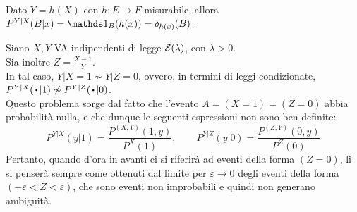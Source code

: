 \begin{ese}
Dato $Y = h(X)$ con $h: E \to F$ misurabile, allora $P^{Y|X}(B|x) = \Ind_B(h(x)) = \delta_{h(x)}(B)$.
\end{ese}
\medskip

\begin{ese}
Siano $X, Y$ VA indipendenti di legge $\mathcal E(\lambda)$, con $\lambda > 0$. \\
Sia inoltre $Z = \frac {X - 1} Y$. \\
In tal caso, $Y | X = 1 \not\sim Y | Z = 0$, ovvero, in termini di leggi condizionate, $P^{Y|X}(\, \bigcdot \, | 1) \not\sim P^{Y|Z}(\, \bigcdot \,|0)$. \\
Questo problema sorge dal fatto che l'evento $A = (X = 1) = (Z = 0)$ abbia probabilità nulla, e che dunque le seguenti espressioni non sono ben definite: $$P^{Y|X}(y | 1) = \frac {P^{(X, Y)}(1, y)} {P^X(1)}, \qquad P^{Y|Z}(y | 0) = \frac {P^{(Z, Y)}(0, y)} {P^Z(0)}$$
Pertanto, quando d'ora in avanti ci si riferirà ad eventi della forma $(Z=0)$, li si penserà sempre come ottenuti dal limite per $\varepsilon \to 0$ degli eventi della forma $(-\varepsilon < Z < \varepsilon)$, che sono eventi non improbabili e quindi non generano ambiguità.
\end{ese}
